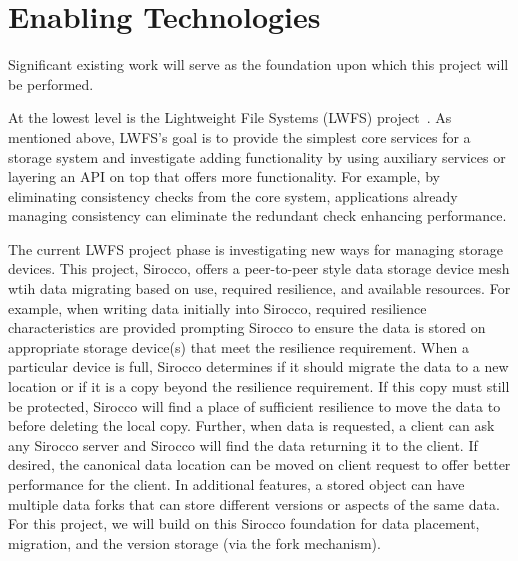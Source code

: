 \section{Enabling Technologies}
\label{sec:enabling-technologies}
Significant existing work will serve as the foundation upon which this project
will be performed.

At the lowest level is the Lightweight File Systems (LWFS) project~\cite{oldfield:lwfs}.
As mentioned above, LWFS's goal is to provide the simplest core services for
a storage system and investigate adding functionality by using auxiliary
services or layering an API on top that offers more functionality. For example,
by eliminating consistency checks from the core system, applications already
managing consistency can eliminate the redundant check enhancing performance.

The current LWFS project phase is investigating new ways for managing storage
devices. This project, Sirocco, offers a peer-to-peer style data storage device
mesh wtih data migrating based on use, required resilience, and available
resources. For example, when writing data initially into Sirocco, required
resilience characteristics are provided prompting Sirocco to ensure the data is
stored on appropriate storage device(s) that meet the resilience requirement.
When a particular device is full, Sirocco determines if it should migrate the
data to a new location or if it is a copy beyond the resilience requirement. If
this copy must still be protected, Sirocco will find a place of sufficient 
resilience to move the data to before deleting the local copy. Further, when
data is requested, a client can ask any Sirocco server and Sirocco will find
the data returning it to the client. If desired, the canonical data location
can be moved on client request to offer better performance for the client. In
additional features, a stored object can have multiple data forks that can
store different versions or aspects of the same data.  For this project, we
will build on this Sirocco foundation for data placement, migration, and the
version storage (via the fork mechanism). 

